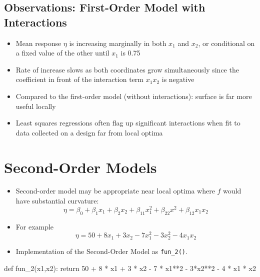\documentclass[
  letterpaper,
  DIV=11,
  numbers=noendperiod]{scrreprt}
\newenvironment{Shaded}{\begin{snugshade}}{\end{snugshade}}
\newcommand{\ControlFlowTok}[1]{\textcolor[rgb]{0.00,0.23,0.31}{#1}}
\newcommand{\DecValTok}[1]{\textcolor[rgb]{0.68,0.00,0.00}{#1}}
\newcommand{\KeywordTok}[1]{\textcolor[rgb]{0.00,0.23,0.31}{#1}}
\newcommand{\NormalTok}[1]{\textcolor[rgb]{0.00,0.23,0.31}{#1}}
\newcommand{\OperatorTok}[1]{\textcolor[rgb]{0.37,0.37,0.37}{#1}}
\providecommand{\tightlist}{%
  \setlength{\itemsep}{0pt}\setlength{\parskip}{0pt}}\usepackage{longtable,booktabs,array}
\begin{document}
\hypertarget{observations-first-order-model-with-interactions}{%
\subsection{Observations: First-Order Model with
Interactions}\label{observations-first-order-model-with-interactions}}

\begin{itemize}
\tightlist
\item
  Mean response \(\eta\) is increasing marginally in both \(x_1\) and
  \(x_2\), or conditional on a fixed value of the other until \(x_1\) is
  0.75
\item
  Rate of increase slows as both coordinates grow simultaneously since
  the coefficient in front of the interaction term \(x_1 x_2\) is
  negative
\item
  Compared to the first-order model (without interactions): surface is
  far more useful locally
\item
  Least squares regressions often flag up significant interactions when
  fit to data collected on a design far from local optima
\end{itemize}

\hypertarget{second-order-models}{%
\section{Second-Order Models}\label{second-order-models}}

\begin{itemize}
\item
  Second-order model may be appropriate near local optima where \(f\)
  would have substantial curvature:
  \[\eta = \beta_0 + \beta_1 x_1 + \beta_2 x_2  + \beta_{11}x_1^2 + \beta_{22}x^2 + \beta_{12} x_1 x_2\]
\item
  For example \[\eta = 50 + 8 x_1 + 3x_2 - 7x_1^2 - 3 x_2^2 - 4x_1x_2\]
\item
  Implementation of the Second-Order Model as \texttt{fun\_2()}.
\end{itemize}

\begin{Shaded}
\begin{Highlighting}[]
\KeywordTok{def}\NormalTok{ fun\_2(x1,x2):}
    \ControlFlowTok{return} \DecValTok{50} \OperatorTok{+} \DecValTok{8} \OperatorTok{*}\NormalTok{ x1 }\OperatorTok{+} \DecValTok{3} \OperatorTok{*}\NormalTok{ x2 }\OperatorTok{{-}} \DecValTok{7} \OperatorTok{*}\NormalTok{ x1}\OperatorTok{**}\DecValTok{2} \OperatorTok{{-}} \DecValTok{3}\OperatorTok{*}\NormalTok{x2}\OperatorTok{**}\DecValTok{2} \OperatorTok{{-}} \DecValTok{4} \OperatorTok{*}\NormalTok{ x1 }\OperatorTok{*}\NormalTok{ x2}
\end{Highlighting}
\end{Shaded}
\end{document}

